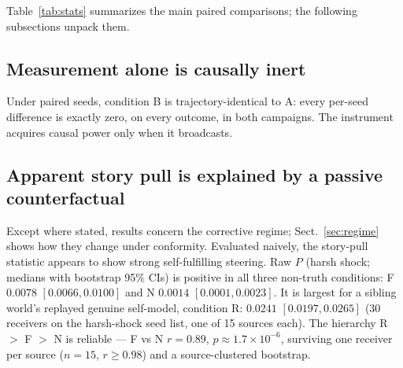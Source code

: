 \documentclass{svproc}
\begin{document}
Table~\ref{tab:stats} summarizes the main paired comparisons; the following subsections unpack them.

\subsection{Measurement alone is causally inert}
Under paired seeds, condition B is trajectory-identical to A: every per-seed
difference is exactly zero, on every outcome, in both campaigns. The
instrument acquires causal power only when it broadcasts.

\subsection{Apparent story pull is explained by a passive counterfactual}
\label{sec:pull}
Except where stated, results concern the corrective regime; Sect.~\ref{sec:regime} shows how they change under conformity.
Evaluated naively, the story-pull statistic appears to show strong
self-fulfilling steering. Raw $P$ (harsh shock; medians with bootstrap
95\% CIs) is positive in all three non-truth conditions: F $0.0078$
$[0.0066, 0.0100]$ and N $0.0014$ $[0.0001, 0.0023]$. It is largest for a sibling
world's replayed genuine self-model, condition R: $0.0241$ $[0.0197, 0.0265]$
(30 receivers on the harsh-shock seed list, one of 15 sources each). The
hierarchy R $>$ F $>$ N is reliable --- F vs N $r=0.89$,
$p\!\approx\!1.7\times10^{-6}$, surviving one receiver per source ($n=15$,
$r\geq0.98$) and a source-clustered bootstrap.
\end{document}
